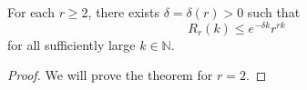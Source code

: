 %


\begin{theorem}[Balister et al. 2024] \label{thm:Ramsey:multicolour}
    For each $r \ge 2$, there exists $\delta = \delta(r) > 0$ such that 
    \begin{equation*}
        R_r(k) \le e^{-\delta k} r^{rk}
    \end{equation*} 
    for all sufficiently large $k \in \mathbb{N}$. 
\end{theorem}

\begin{proof}
    We will prove the theorem for $r = 2$.
\end{proof}
